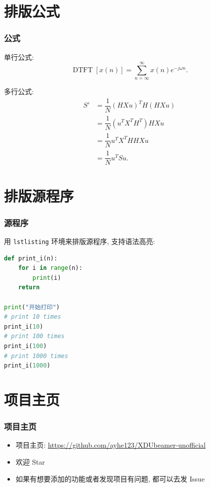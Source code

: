 \documentclass{ctexbeamer}
\begin{document}
\section{排版公式}
\begin{frame}
    \frametitle{公式}
    单行公式:
    \[\operatorname{DTFT}[x(n)]=\sum\limits_{n=\infty}^{\infty}x(n)e^{-j\omega n}.\]

    多行公式:
    \begin{align*}
        S' & =\dfrac{1}{N}(HXu)^TH(HXu) \\
        & =\dfrac{1}{N}(u^TX^TH^T)HXu \\
        & =\dfrac{1}{N}u^TX^THHXu \\
        & =\dfrac{1}{N}u^TSu.
    \end{align*}
\end{frame}
\section{排版源程序}
\begin{frame}[fragile]
    \frametitle{源程序}
    用 \verb|lstlisting| 环境来排版源程序, 支持语法高亮:

    \begin{lstlisting}[language=Python]
def print_i(n):
    for i in range(n):
        print(i)
    return

print("开始打印")
# print 10 times
print_i(10)
# print 100 times
print_i(100)
# print 1000 times
print_i(1000)
    \end{lstlisting}
    \end{frame}
\section{项目主页}
\begin{frame}[fragile]
    \frametitle{项目主页}
    \begin{itemize}
        \item 项目主页: \url{https://github.com/ayhe123/XDUbeamer-unofficial}
        \item 欢迎 Star
        \item 如果有想要添加的功能或者发现项目有问题, 都可以去发 Issue
    \end{itemize}
\end{frame}
\end{document}
